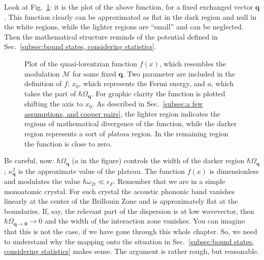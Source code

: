Look at Fig.~\ref{fig:quasi-lorentzian function bcs}: it is the plot of the above function, for a fixed exchanged vector $\mathbf{q}$.
This function clearly can be approximated as flat in the dark region and null in the white regions, while the lighter regions are ``small'' and can be neglected. Then the mathematical structure reminds of the potential defined in Sec.~\ref{subsec:bound states, considering statistics}.

\begin{figure}
	\centering
	
	\caption{Plot of the quasi-lorentzian function $f(x)$, which resembles the modulation $\mathcal{M}$ for some fixed $\mathbf{q}$. Two parameter are included in the definition of $f$: $x_0$, which represents the Fermi energy, and $a$, which takes the part of $\hbar\Omega_\mathbf{q}$. For graphic clarity the function is plotted shifting the axis to $x_0$. As described in Sec.~\ref{subsec:a few assumptions, and cooper pairs}, the lighter region indicates the regions of mathematical divergence of the function, while the darker region represents a sort of \textit{plateau} region. In the remaining region the function is close to zero.}
	\label{fig:quasi-lorentzian function bcs}
\end{figure}

Be careful, now: $\hbar\Omega_\mathbf{q}$ ($a$ in the figure) controls the width of the darker region $\hbar\Omega_\mathbf{q}$; $\kappa_\mathbf{q}^2$ is the approximate value of the plateau. The function $f(x)$ is dimensionless and modulates the value $\hbar\omega_D \ll \epsilon_F$.
Remember that we are in a simple monoatomic crystal. For such crystal the acoustic phononic band vanishes linearly at the center of the Brillouin Zone and is approximately flat at the boundaries. If, say, the relevant part of the dispersion is at low wavevector, then $\hbar\Omega_{\mathbf{q}\to\mathbf{0}}\to0$ and the width of the interaction zone vanishes. You can imagine that this is not the case, if we have gone through this whole chapter.
So, we need to understand why the mapping onto the situation in Sec.~\ref{subsec:bound states, considering statistics} makes sense. The argument is rather rough, but reasonable.

